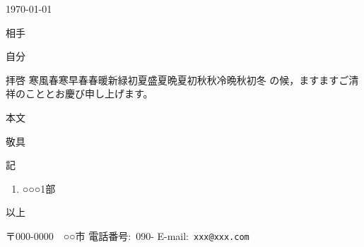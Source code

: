 \documentclass[10pt, a4j, uplatex]{jsarticle}
\def\挨拶{\noindent 拝啓\hspace{1zw}\ifcase\month\or
寒風\or 春寒\or 早春\or 春暖\or 新緑\or 初夏\or 盛夏\or 晩夏\or 初秋\or 秋冷\or 晩秋\or 初冬\fi
の候，ますますご清祥のこととお慶び申し上げます。}
\begin{document}
\begin{flushright}
\today
\end{flushright}
\begin{flushleft}
相手
\end{flushleft}
\begin{flushright}
自分
\end{flushright}

\vspace{\baselineskip}

\挨拶

本文

\hfill
敬具

\vspace{\baselineskip}

{\centering
記
\begin{center}
\begin{minipage}{.9\textwidth}
\begin{enumerate}
	\item ○○○\dotfill 1部
\end{enumerate}
\begin{flushright}
以上
\end{flushright}
\end{minipage}
\end{center}
}
\vfill

\hfill
\vbox{
\hbox{}
\hbox{〒000-0000　○○市}
\hbox{電話番号: 090-}
\hbox{E-mail: \texttt{\small xxx@xxx.com}}
}
\end{document}
